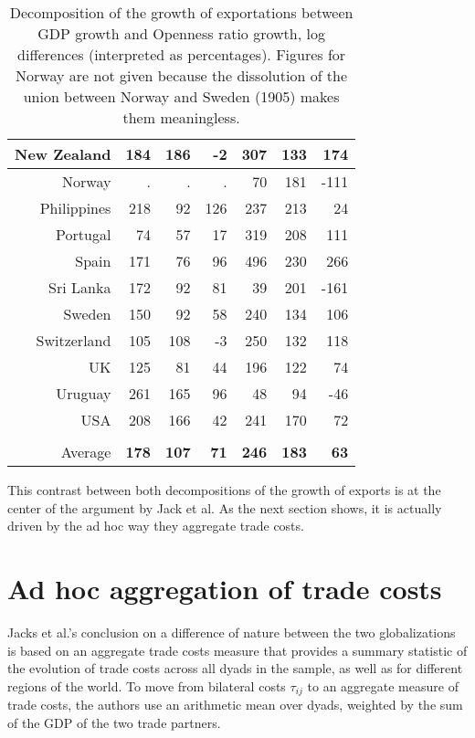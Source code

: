 \documentclass{article}
\begin{document}
\begin{table}
\begin{tabular}{|r|r|r|r|r|r|r|}
\hline
New Zealand & 184 & 186 & -2 & 307 & 133 & 174\\
\hline
Norway & . & . & . & 70 & 181 & -111\\
\hline
Philippines & 218 & 92 & 126 & 237 & 213 & 24\\
\hline
Portugal & 74 & 57 & 17 & 319 & 208 & 111\\
\hline
Spain & 171 & 76 & 96 & 496 & 230 & 266\\
\hline
Sri Lanka & 172 & 92 & 81 & 39 & 201 & -161\\
\hline
Sweden & 150 & 92 & 58 & 240 & 134 & 106\\
\hline
Switzerland & 105 & 108 & -3 & 250 & 132 & 118\\
\hline
UK & 125 & 81 & 44 & 196 & 122 & 74\\
\hline
Uruguay & 261 & 165 & 96 & 48 & 94 & -46\\
\hline
USA & 208 & 166 & 42 & 241 & 170 & 72\\
\hline
 &  &  &  &  &  & \\
\hline
Average & \textbf{178} & \textbf{107} & \textbf{71} & \textbf{246} & \textbf{183} & \textbf{63}\\
\hline
\end{tabular}
\caption{Decomposition of the growth of exportations between
GDP growth and Openness ratio growth, log differences (interpreted as percentages).
Figures for Norway are not given because the dissolution of the
union between Norway and Sweden (1905) makes them
meaningless.}\label{OR}
\end{table}

This contrast between both decompositions of the growth of exports is at the center of the argument by Jack et al. As the next section shows, it is actually driven by the ad hoc way they aggregate trade costs.

\section{\label{2} Ad hoc aggregation of trade costs}

Jacks et al.'s conclusion on a difference of nature between the
two globalizations is based on an aggregate trade costs
measure that provides a summary statistic of the
evolution of trade costs across all dyads in the sample, as
well as for different regions of the world. To move from
bilateral costs $\tau_{ij}$ to an aggregate measure of trade
costs, the authors use an arithmetic mean over dyads, weighted
by the sum of the GDP of the two trade partners.
\end{document}
